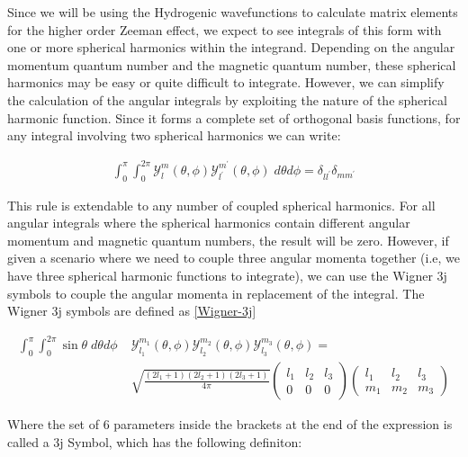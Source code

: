         Since we will be using the Hydrogenic wavefunctions to calculate matrix elements for the higher order Zeeman effect, we expect to see integrals of this form with one or more spherical harmonics within the integrand. Depending on the angular momentum quantum number and the magnetic quantum number, these spherical harmonics may be easy or quite difficult to integrate. However, we can simplify the calculation of the angular integrals by exploiting the nature of the spherical harmonic function. Since it forms a complete set of orthogonal basis functions, for any integral involving two spherical harmonics we can write:

        \begin{align}
            \int_0^\pi \int_0^{2\pi} \mathcal{Y}^m_l(\theta, \phi) \mathcal{Y}^{m^\prime}_{l^\prime} (\theta, \phi) \; d\theta d\phi = \delta_{ll^\prime} \delta_{mm^\prime}\label{eq:delta_spherical_harmonic}
        \end{align}

        This rule is extendable to any number of coupled spherical harmonics. For all angular integrals where the spherical harmonics contain different angular momentum and magnetic quantum numbers, the result will be zero. However, if given a scenario where we need to couple three angular momenta together (i.e, we have three spherical harmonic functions to integrate), we can use the Wigner 3j symbols to couple the angular momenta in replacement of the integral. The Wigner 3j symbols are defined as \ref{Wigner-3j}

        \begin{align}
            \int_0^\pi \int_0^{2\pi} \sin \theta \; d\theta d\phi\;& \mathcal{Y}^{m_1}_{l_1}(\theta, \phi) \mathcal{Y}^{m_2}_{l_2} (\theta, \phi) \mathcal{Y}^{m_3}_{l_3} (\theta, \phi) =\\
             &\sqrt{\frac{(2l_1 + 1)(2l_2 + 1) (2l_3 + 1)}{4 \pi}} \begin{pmatrix}
                l_1 & l_2 & l_3 \\
                0 & 0 & 0
            \end{pmatrix} \begin{pmatrix}
                l_1 & l_2 & l_3 \\
                m_1 & m_2 & m_3 
            \end{pmatrix} \nonumber
        \end{align}

        Where the set of $6$ parameters inside the brackets at the end of the expression is called a $3$j Symbol, which has the following definiton:

